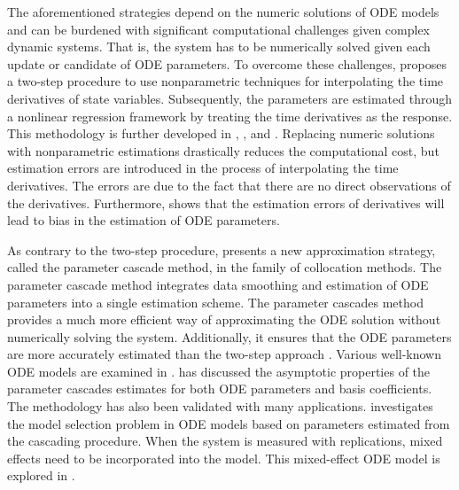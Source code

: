 The aforementioned strategies depend on the numeric solutions of ODE models and can be burdened with significant computational challenges given complex dynamic systems. That is, the system has to be numerically solved given each update or candidate of ODE parameters. To overcome these challenges, \cite{Varah} proposes a two-step procedure to use nonparametric techniques for interpolating the time derivatives of state variables. Subsequently, the parameters are estimated through a nonlinear regression framework by treating the time derivatives as the response. This methodology is further developed in  \cite{wu_localestimation}, \cite{ramsayFDA} , and \cite{brunel2008}. Replacing numeric solutions with nonparametric estimations drastically reduces the computational cost, but estimation errors are introduced in the process of interpolating the time derivatives. The errors are due to the fact that there are no direct observations of the derivatives. Furthermore, \cite{varyingODE} shows that the estimation errors of derivatives will lead to bias in the estimation of ODE parameters. 

As contrary to the two-step procedure, \cite{parcascade} presents a new approximation strategy, called the parameter cascade method, in the family of collocation methods. The parameter cascade method integrates data smoothing and estimation of ODE parameters into a single estimation scheme. The parameter cascades method provides a much more efficient way of approximating the ODE solution without numerically solving the system. Additionally, it ensures that the ODE parameters are more accurately estimated than the two-step approach \citep{varyingODE}. Various well-known ODE models are examined in \cite{parcascade}. \cite{qi2010} has discussed the asymptotic properties of the parameter cascades estimates for both ODE parameters and basis coefficients. The methodology has also been validated with many applications. \cite{selectionofODE} investigates the model selection problem in ODE models based on parameters estimated from the cascading procedure. When the system is measured with replications, mixed effects need to be incorporated into the model. This mixed-effect ODE model is explored in \cite{ODEmixedeffect}. 


